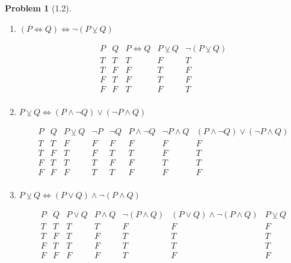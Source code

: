 \documentclass[12pt]{article}
\theoremstyle{definition}
\newtheorem{problem}{Problem}
\begin{document}
\begin{problem}[1.2]
\begin{enumerate}[label=(\alph*)]
\begin{solution}
        \end{solution}
        \item $(P \iff Q) \iff \neg (P \veebar Q)$
        \begin{solution}
            \begin{displaymath}
                \begin{array}{c|c|c|c|c}
                P & Q & P \iff Q & P \veebar Q & \neg (P \veebar Q)\\
                \hline
                T & T & T & F & T\\
                T & F & F & T & F\\
                F & T & F & T & F\\
                F & F & T & F & T\\
                \end{array}
            \end{displaymath}                
        \end{solution}
        \item $P \veebar Q \iff (P \land \neg Q) \lor (\neg P \land Q)$
        \begin{solution}
            \begin{displaymath}
                \begin{array}{c|c|c|c|c|c|c|c}
                P & Q & P \veebar Q & \neg P & \neg Q & P \land \neg Q & \neg P \land Q & (P \land \neg Q) \lor (\neg P \land Q)\\
                \hline
                T & T & F & F & F & F & F & F\\
                T & F & T & F & T & T & F & T\\
                F & T & T & T & F & F & T & T\\
                F & F & F & T & T & F & F & F\\
                \end{array}
            \end{displaymath}                
        \end{solution}
        \item $P \veebar Q \iff (P \lor Q) \land \neg (P \land Q)$
        \begin{solution}
            \begin{displaymath}
                \begin{array}{c|c|c|c|c|c|c|c|c}
                P & Q & P \lor Q & P \land Q & \neg (P \land Q) & (P \lor Q) \land \neg (P \land Q) & P \veebar Q\\
                \hline
                T & T & T & T & F & F & F\\
                T & F & T & F & T & T & T\\
                F & T & T & F & T & T & T\\
                F & F & F & F & T & F & F\\
                \end{array}
            \end{displaymath}                
        \end{solution}


\end{enumerate}
\end{problem}
\end{document}
